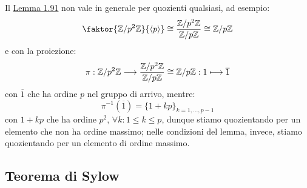 \documentclass[11pt]{scrartcl}
\begin{document}
\begin{remark}
    Il \hyperref[l:1.91]{Lemma 1.91} non vale in generale per quozienti qualsiasi, ad esempio:
        \[ \faktor{\Z{p^2}}{\left<p\right>} \cong \frac{\Z{p^2}}{\Zp}\cong \Zp
            \]
    e con la proiezione:
        \[ \pi: \mathbb{Z}/{p^2}\mathbb{Z} \longrightarrow \frac{\mathbb{Z}/{p^2}\mathbb{Z}}{{\mathbb Z}/p{\mathbb Z}} \cong {\mathbb Z}/p{\mathbb Z} : 1 \longmapsto \overline 1
            \]
    con $\overline 1$ che ha ordine $p$ nel gruppo di arrivo, mentre:
        \[ \pi^{-1}(\overline 1) = \{1 + kp\}_{k = 1,\ldots,p-1}
            \]
    con $1+kp$ che ha ordine $p^2$, $\forall k : 1 \leq k \leq p$, dunque stiamo quozientando per un elemento che non ha ordine massimo;
     nelle condizioni del lemma, invece, stiamo quozientando per un elemento di ordine massimo.
\end{remark}


\newpage
\subsection{Teorema di Sylow}
\end{document}
